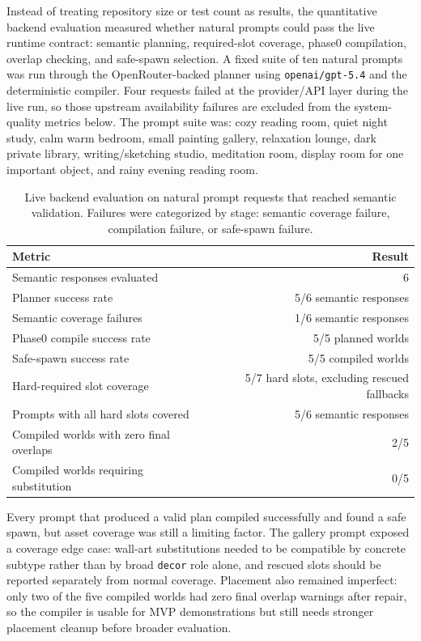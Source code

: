 \documentclass[12pt]{article}
\begin{document}
Instead of treating repository size or test count as results, the quantitative backend evaluation measured whether natural prompts could pass the live runtime contract: semantic planning, required-slot coverage, phase0 compilation, overlap checking, and safe-spawn selection. A fixed suite of ten natural prompts was run through the OpenRouter-backed planner using \texttt{openai/gpt-5.4} and the deterministic compiler. Four requests failed at the provider/API layer during the live run, so those upstream availability failures are excluded from the system-quality metrics below. The prompt suite was: cozy reading room, quiet night study, calm warm bedroom, small painting gallery, relaxation lounge, dark private library, writing/sketching studio, meditation room, display room for one important object, and rainy evening reading room.

\begin{table}[h]
\centering
\begin{tabular}{lr}
\hline
Metric & Result \\
\hline
Semantic responses evaluated & 6 \\
Planner success rate & 5/6 semantic responses \\
Semantic coverage failures & 1/6 semantic responses \\
Phase0 compile success rate & 5/5 planned worlds \\
Safe-spawn success rate & 5/5 compiled worlds \\
Hard-required slot coverage & 5/7 hard slots, excluding rescued fallbacks \\
Prompts with all hard slots covered & 5/6 semantic responses \\
Compiled worlds with zero final overlaps & 2/5 \\
Compiled worlds requiring substitution & 0/5 \\
\hline
\end{tabular}
\caption{Live backend evaluation on natural prompt requests that reached semantic validation. Failures were categorized by stage: semantic coverage failure, compilation failure, or safe-spawn failure.}
\label{tab:live-backend-eval}
\end{table}

Every prompt that produced a valid plan compiled successfully and found a safe spawn, but asset coverage was still a limiting factor. The gallery prompt exposed a coverage edge case: wall-art substitutions needed to be compatible by concrete subtype rather than by broad \texttt{decor} role alone, and rescued slots should be reported separately from normal coverage. Placement also remained imperfect: only two of the five compiled worlds had zero final overlap warnings after repair, so the compiler is usable for MVP demonstrations but still needs stronger placement cleanup before broader evaluation.
\end{document}
